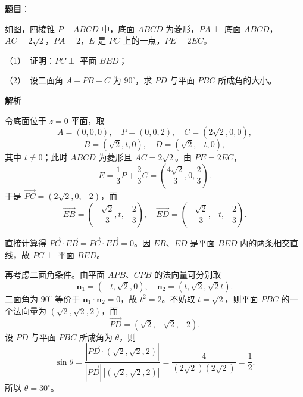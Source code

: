 \begin{answer}

\textbf{题目}：

如图，四棱锥 $P-ABCD$ 中，底面 $ABCD$ 为菱形，$PA\perp$ 底面 $ABCD$，$AC=2\sqrt2$，$PA=2$，$E$ 是 $PC$ 上的一点，$PE=2EC$。
\nopagebreak[4]
\begin{center}\end{center}
\nopagebreak[4]
（1）　证明：$PC\perp$ 平面 $BED$；

（2）　设二面角 $A-PB-C$ 为 $90^\circ$，求 $PD$ 与平面 $PBC$ 所成角的大小。

\textbf{解析}

令底面位于 $z=0$ 平面，取
\nopagebreak[4]
\[
A=(0,0,0),\quad P=(0,0,2),\quad C=(2\sqrt2,0,0),
\]
\nopagebreak[4]
\[
B=(\sqrt2,t,0),\quad D=(\sqrt2,-t,0),
\]
其中 $t\neq0$；此时 $ABCD$ 为菱形且 $AC=2\sqrt2$。由 $PE=2EC$，
\nopagebreak[4]
\[
E=\frac13P+\frac23C=\left(\frac{4\sqrt2}{3},0,\frac23\right).
\]
于是 $\overrightarrow{PC}=(2\sqrt2,0,-2)$，而
\nopagebreak[4]
\[
\overrightarrow{EB}=\left(-\frac{\sqrt2}{3},t,-\frac23\right),
\quad
\overrightarrow{ED}=\left(-\frac{\sqrt2}{3},-t,-\frac23\right).
\]

直接计算得 $\overrightarrow{PC}\cdot\overrightarrow{EB}=\overrightarrow{PC}\cdot\overrightarrow{ED}=0$。因 $EB\text{、}ED$ 是平面 $BED$ 内的两条相交直线，故 $PC\perp$ 平面 $BED$。


再考虑二面角条件。由平面 $APB$、$CPB$ 的法向量可分别取
\nopagebreak[4]
\[
\boldsymbol n_1=(-t,\sqrt2,0),
\quad
\boldsymbol n_2=(t,\sqrt2,\sqrt2t).
\]
二面角为 $90^\circ$ 等价于 $\boldsymbol n_1\cdot\boldsymbol n_2=0$，故 $t^2=2$。不妨取 $t=\sqrt2$，则平面 $PBC$ 的一个法向量为 $(\sqrt2,\sqrt2,2)$，而
\nopagebreak[4]
\[
\overrightarrow{PD}=(\sqrt2,-\sqrt2,-2).
\]
设 $PD$ 与平面 $PBC$ 所成角为 $\theta$，则
\nopagebreak[4]
\[
\sin\theta
=\frac{|\overrightarrow{PD}\cdot(\sqrt2,\sqrt2,2)|}
{|\overrightarrow{PD}|\,|(\sqrt2,\sqrt2,2)|}
=\frac4{(2\sqrt2)(2\sqrt2)}=\frac12.
\]
所以 $\theta=30^\circ$。



\end{answer}
